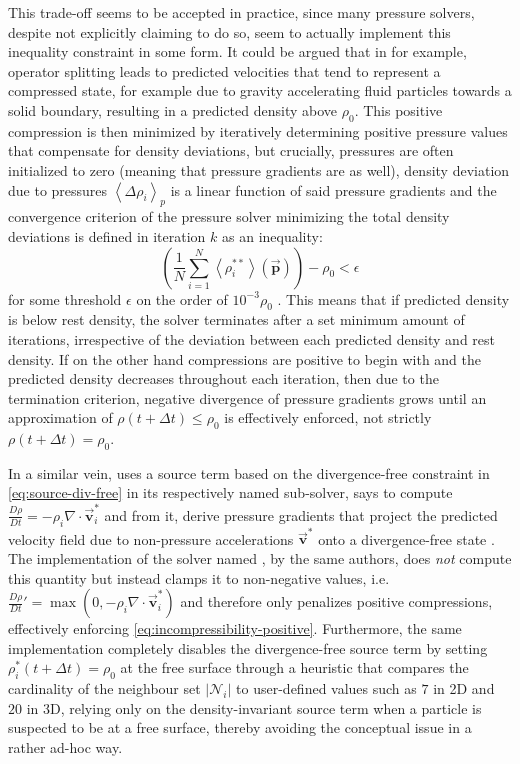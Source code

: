 \documentclass[conference]{IEEEtran}
\newcommand\abs[1]{\left|#1\right|}
\newcommand\vek[1]{\vec{\bm{#1}}}
\newcommand\br[1]{\left(#1\right)}
\newcommand\abr[1]{\left\langle#1\right\rangle}
\newcommand\divergence{{\nabla\cdot}}
\begin{document}
This trade-off seems to be accepted in practice, since many pressure solvers, despite not explicitly claiming to do so, seem to actually implement this inequality constraint in some form. It could be argued that in \autocite[\ac{iisph}]{iisph} for example, operator splitting leads to predicted velocities that tend to represent a compressed state, for example due to gravity accelerating fluid particles towards a solid boundary, resulting in a predicted density above $\rho_0$. This positive compression is then minimized by iteratively determining positive pressure values that compensate for density deviations, but crucially, pressures are often initialized to zero (meaning that pressure gradients are as well), density deviation due to pressures $\abr{\Delta \rho_i}_{p}$ is a linear function of said pressure gradients and the convergence criterion of the pressure solver minimizing the total density deviations is defined in iteration $k$ as an inequality:
\begin{equation}\label{eq:iisph-termination}
  \br{\frac{1}{N}\sum_{i=1}^N \abr{\rho_i^{**}}(\vek{p})} - \rho_0 < \epsilon
\end{equation} 
for some threshold $\epsilon$ on the order of $10^{-3}\rho_0$ \cite{iisph}. This means that if predicted density is below rest density, the solver terminates after a set minimum amount of iterations, irrespective of the deviation between each predicted density and rest density. If on the other hand compressions are positive to begin with and the predicted density decreases throughout each iteration, then due to the termination criterion, negative divergence of pressure gradients grows until an approximation of $\rho\br{t+\Delta t} \leq \rho_0$ is effectively enforced, not strictly $\rho\br{t+\Delta t} = \rho_0$. 

In a similar vein, \autocite[\ac{dfsph}]{dfsph} uses a source term based on the divergence-free constraint in \autoref{eq:source-div-free} in its respectively named sub-solver, says to compute $\frac{D\rho}{Dt}=-\rho_i\divergence\vek{v}_i^*$ and from it, derive pressure gradients that project the predicted velocity field due to non-pressure accelerations $\vek{v}^*$ onto a divergence-free state \cite{dfsph}. The implementation of the solver named \autocite[SPlisHSPlasH]{SPlisHSPlasH_Library}, by the same authors, does \textit{not} compute this quantity but instead clamps it to non-negative values, i.e. $\frac{D\rho}{Dt}'=\max\br{0, -\rho_i\divergence\vek{v}_i^*}$ and therefore only penalizes positive compressions, effectively enforcing \autoref{eq:incompressibility-positive}. Furthermore, the same implementation completely disables the divergence-free source term by setting $\rho_i^*(t+\Delta t) = \rho_0$ at the free surface through a heuristic that compares the cardinality of the neighbour set $\abs{\mathcal{N}_i}$ to user-defined values such as $7$ in 2D and $20$ in 3D, relying only on the density-invariant source term when a particle is suspected to be at a free surface, thereby avoiding the conceptual issue in a rather ad-hoc way.
\end{document}
